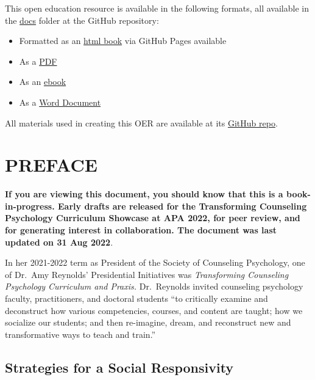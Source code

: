 \documentclass[
  11pt,
]{book}
\providecommand{\tightlist}{%
  \setlength{\itemsep}{0pt}\setlength{\parskip}{0pt}}
\begin{document}
This open education resource is available in the following formats, all available in the \href{https://github.com/lhbikos/TransformingResearchMethods/tree/main/docs}{docs} folder at the GitHub repository:

\begin{itemize}
\tightlist
\item
  Formatted as an \href{https://lhbikos.github.io/TransformingResearchMethods/}{html book} via GitHub Pages available
\item
  As a \href{https://github.com/lhbikos/TransformingResearchMethods/blob/main/docs/TransformingResearchMethods.pdf}{PDF}
\item
  As an \href{https://github.com/lhbikos/TransformingResearchMethods/blob/main/docs/TransformingResearchMethods.epub}{ebook}
\item
  As a \href{https://github.com/lhbikos/TransformingResearchMethods/blob/main/docs/TransformingResearchMethods.docx}{Word Document}
\end{itemize}

All materials used in creating this OER are available at its \href{https://github.com/lhbikos/TransformingResearchMethods}{GitHub repo}.

\hypertarget{preface}{%
\chapter*{PREFACE}\label{preface}}

\textbf{If you are viewing this document, you should know that this is a book-in-progress. Early drafts are released for the Transforming Counseling Psychology Curriculum Showcase at APA 2022, for peer review, and for generating interest in collaboration. The document was last updated on 31 Aug 2022}.

In her 2021-2022 term as President of the Society of Counseling Psychology, one of Dr.~Amy Reynolds' Presidential Initiatives was \emph{Transforming Counseling Psychology Curriculum and Praxis.} Dr.~Reynolds invited counseling psychology faculty, practitioners, and doctoral students ``to critically examine and deconstruct how various competencies, courses, and content are taught; how we socialize our students; and then re-imagine, dream, and reconstruct new and transformative ways to teach and train.''

\hypertarget{strategies-for-a-social-responsivity}{%
\section*{Strategies for a Social Responsivity}\label{strategies-for-a-social-responsivity}}
\end{document}
